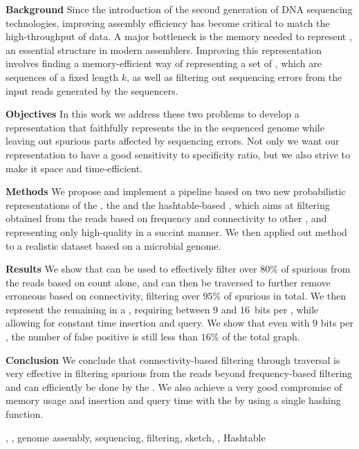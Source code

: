 \abstract

\textbf{Background} Since the introduction of the second generation of DNA sequencing technologies, improving assembly efficiency has become critical to match the high-throughput of data. A major bottleneck is the memory needed to represent , an essential structure in modern assemblers. Improving this representation involves finding a memory-efficient way of representing a set of \kmers, which are sequences of a fixed length $k$, as well as filtering out sequencing errors from the input reads generated by the sequencers.

\noindent\textbf{Objectives} In this work we address these two problems to develop a \dBG representation that faithfully represents the \kmers in the sequenced genome while leaving out spurious parts affected by sequencing errors. Not only we want our representation to have a good sensitivity to specificity ratio, but we also strive to make it space and time-efficient.

\noindent\textbf{Methods} We propose and implement a pipeline based on two new probabilistic representations of the \dBG, the  \dBCM and the hashtable-based \dBHT, which aims at filtering  obtained from the reads based on frequency and connectivity to other , and representing only high-quality  in a succint manner. We then applied out method to a realistic dataset based on a microbial genome.

\noindent\textbf{Results} We show that \dBCM can be used to effectively filter over $80\%$ of spurious  from the reads based on count alone, and can then be traversed to further remove erroneous  based on connectivity, filtering over $95\%$ of spurious  in total. We then represent the remaining  in a \dBHT, requiring between $9$ and $16$~bits per \kmer, while allowing for constant time insertion and query. We show that even with $9$ bits per \kmer, the number of false positive  is still less than $16\%$ of the total graph.

\noindent\textbf{Conclusion} We conclude that connectivity-based filtering through traversal is very effective in filtering spurious  from the reads beyond frequency-based filtering and can efficiently be done by the \dBCM. We also achieve a very good compromise of memory usage and insertion and query time with the \dBHT by using a single hashing function.

\begin{keywords}
\dBG, \kmer, genome assembly, sequencing, filtering, sketch, \cm, Hashtable
\end{keywords}